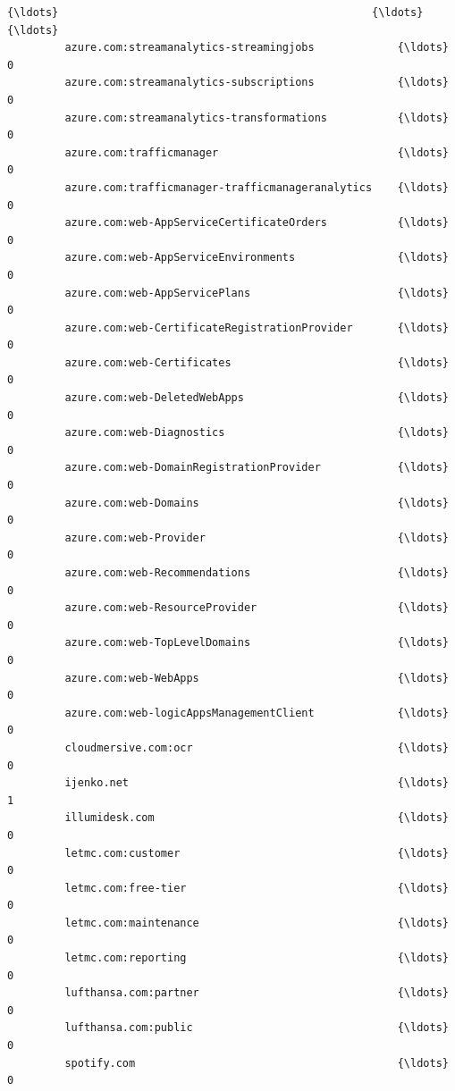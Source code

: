 \documentclass[11pt]{article}
\begin{document}
\begin{Verbatim}[commandchars=\\\{\}]
         {\ldots}                                                 {\ldots}      {\ldots}   
         azure.com:streamanalytics-streamingjobs             {\ldots}        0   
         azure.com:streamanalytics-subscriptions             {\ldots}        0   
         azure.com:streamanalytics-transformations           {\ldots}        0   
         azure.com:trafficmanager                            {\ldots}        0   
         azure.com:trafficmanager-trafficmanageranalytics    {\ldots}        0   
         azure.com:web-AppServiceCertificateOrders           {\ldots}        0   
         azure.com:web-AppServiceEnvironments                {\ldots}        0   
         azure.com:web-AppServicePlans                       {\ldots}        0   
         azure.com:web-CertificateRegistrationProvider       {\ldots}        0   
         azure.com:web-Certificates                          {\ldots}        0   
         azure.com:web-DeletedWebApps                        {\ldots}        0   
         azure.com:web-Diagnostics                           {\ldots}        0   
         azure.com:web-DomainRegistrationProvider            {\ldots}        0   
         azure.com:web-Domains                               {\ldots}        0   
         azure.com:web-Provider                              {\ldots}        0   
         azure.com:web-Recommendations                       {\ldots}        0   
         azure.com:web-ResourceProvider                      {\ldots}        0   
         azure.com:web-TopLevelDomains                       {\ldots}        0   
         azure.com:web-WebApps                               {\ldots}        0   
         azure.com:web-logicAppsManagementClient             {\ldots}        0   
         cloudmersive.com:ocr                                {\ldots}        0   
         ijenko.net                                          {\ldots}        1   
         illumidesk.com                                      {\ldots}        0   
         letmc.com:customer                                  {\ldots}        0   
         letmc.com:free-tier                                 {\ldots}        0   
         letmc.com:maintenance                               {\ldots}        0   
         letmc.com:reporting                                 {\ldots}        0   
         lufthansa.com:partner                               {\ldots}        0   
         lufthansa.com:public                                {\ldots}        0   
         spotify.com                                         {\ldots}        0   
         

\end{Verbatim}
\end{document}
